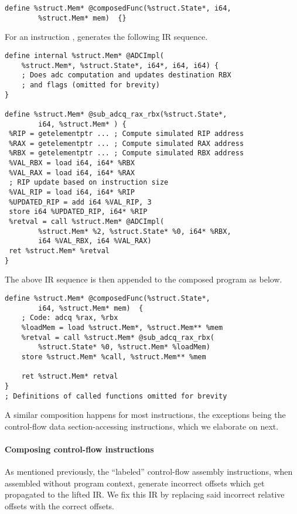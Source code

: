 \begin{lstlisting}[style=LLVM]
define %struct.Mem* @composedFunc(%struct.State*, i64, 
        %struct.Mem* mem)  {}
\end{lstlisting}

For an instruction , \mcsema generates the following
IR sequence.

\begin{lstlisting}[style=LLVM]
define internal %struct.Mem* @ADCImpl(
    %struct.Mem*, %struct.State*, i64*, i64, i64) {
    ; Does adc computation and updates destination RBX
    ; and flags (omitted for brevity)
}

define %struct.Mem* @sub_adcq_rax_rbx(%struct.State*, 
        i64, %struct.Mem* ) {
 %RIP = getelementptr ... ; Compute simulated RIP address
 %RAX = getelementptr ... ; Compute simulated RAX address
 %RBX = getelementptr ... ; Compute simulated RBX address
 %VAL_RBX = load i64, i64* %RBX
 %VAL_RAX = load i64, i64* %RAX
 ; RIP update based on instruction size
 %VAL_RIP = load i64, i64* %RIP
 %UPDATED_RIP = add i64 %VAL_RIP, 3
 store i64 %UPDATED_RIP, i64* %RIP
 %retval = call %struct.Mem* @ADCImpl(
        %struct.Mem* %2, %struct.State* %0, i64* %RBX,
        i64 %VAL_RBX, i64 %VAL_RAX)
 ret %struct.Mem* %retval
}
\end{lstlisting}

The above IR sequence is then appended to the composed program as below.

\begin{lstlisting}[style=LLVM]
define %struct.Mem* @composedFunc(%struct.State*, 
        i64, %struct.Mem* mem)  {
    ; Code: adcq %rax, %rbx	
    %loadMem = load %struct.Mem*, %struct.Mem** %mem
    %retval = call %struct.Mem* @sub_adcq_rax_rbx(
        %struct.State* %0, %struct.Mem* %loadMem)
    store %struct.Mem* %call, %struct.Mem** %mem

    ret %struct.Mem* retval
}
; Definitions of called functions omitted for brevity
\end{lstlisting}

A similar composition happens for most instructions, the exceptions being the control-flow
data section-accessing instructions, which we elaborate on next.

\paragraph{Composing control-flow instructions} As mentioned previously, the
``labeled'' control-flow assembly instructions, when assembled without program
context, generate incorrect offsets which get propagated to the lifted IR.
We fix this IR by replacing said incorrect relative offsets with the correct
offsets.

